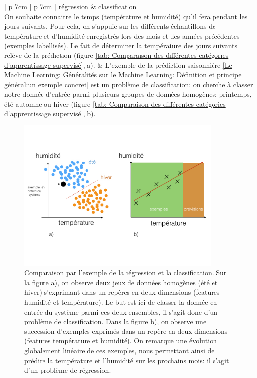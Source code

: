 \begin{table}[h]
	\begin{tabular}{ | p {7cm} | p {7cm} |}
		\hline
		régression & classification \\
		\hline
		On souhaite connaitre le temps (température et humidité) qu'il fera pendant les jours suivants. Pour cela, on s'appuie sur les différents échantillons de température et d'humidité enregistrés lors des mois et des années précédentes (exemples labellisés). Le fait de déterminer la température des jours suivants relève de la prédiction (figure \ref {tab: Comparaison des différentes catégories d'apprentissage supervisé}, a).  
		 &  L'exemple de la prédiction saisonnière \ref{Le Machine Learning: Généralités sur le Machine Learning: Définition et principe général:un exemple concret} est un problème de classification: on cherche à classer notre donnée d'entrée parmi plusieurs groupes de données homogènes: printemps, été automne ou hiver (figure \ref {tab: Comparaison des différentes catégories d'apprentissage supervisé}, b). \\
		\hline 
	\end{tabular}
	\caption[Comparaison des différentes catégories d'apprentissage supervisé]{Comparaison entre l'apprentissage supervisé de type régression et supervisé de type classification}
	\label {tab: Comparaison des différentes catégories d'apprentissage supervisé}
\end{table}

\begin{figure}[h]
	\centering\includegraphics[height=7.5cm]{images/regression_class.jpeg}
	\caption[Comparaison par l'exemple de la régression et la classification]{Comparaison par l'exemple de la régression et la classification. Sur la figure a), on observe deux jeux de données homogènes (été et hiver) s'exprimant dans un repères en deux dimensions (features humidité et température). Le but est ici de classer la donnée en entrée du système parmi ces deux ensembles, il s'agit donc d'un problème de classification. Dans la figure b), on observe une succession d'exemples exprimés dans un repère en deux dimensions (features température et humidité). On remarque une évolution globalement linéaire de ces exemples, nous permettant ainsi de prédire la température et l'humidité sur les prochains mois: il s'agit d'un problème de régression.}
	\label{fig:Comparaison par l'exemple de la régression et la classification}
\end{figure}





